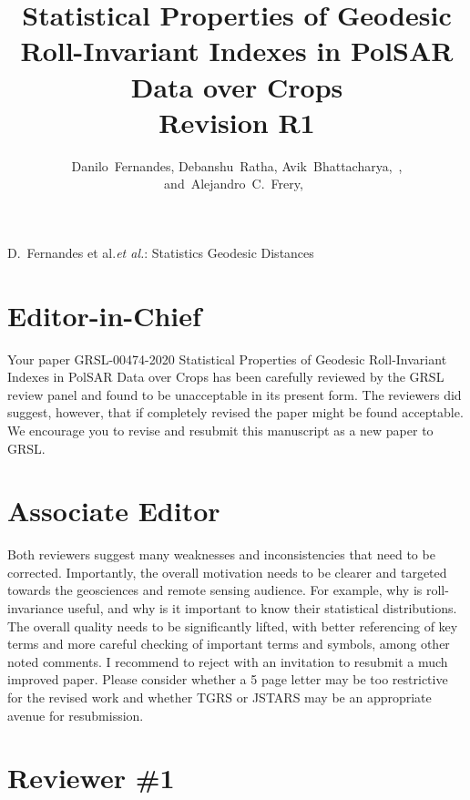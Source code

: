 \documentclass[journal,onecolumn,draftcls,11pt]{IEEEtran}
\begin{document}
\title{Statistical Properties of Geodesic Roll-Invariant Indexes in PolSAR Data over Crops\\
	Revision R1}

\author{Danilo~Fernandes,
	Debanshu~Ratha,
	Avik~Bhattacharya,~,
	and~Alejandro~C.~Frery,~}

%
{D.\ Fernandes et al.\MakeLowercase{\textit{et al.}}: Statistics Geodesic Distances}

\maketitle

\IEEEpeerreviewmaketitle

\section{Editor-in-Chief}

Your paper GRSL-00474-2020 Statistical Properties of Geodesic Roll-Invariant Indexes in PolSAR Data over Crops has been carefully reviewed by the GRSL review panel and found to be unacceptable in its present form. The reviewers did suggest, however, that if completely revised the paper might be found acceptable. We encourage you to revise and resubmit this manuscript as a new paper to GRSL.


\section{Associate Editor}

Both reviewers suggest many weaknesses and inconsistencies that need to be corrected.
Importantly, the overall motivation needs to be clearer and targeted towards the geosciences and remote sensing audience. For example, why is roll-invariance useful, and why is it important to know their statistical distributions.
The overall quality needs to be significantly lifted, with better referencing of key terms and more careful checking of important terms and symbols, among other noted comments.
I recommend to reject with an invitation to resubmit a much improved paper. Please consider whether a 5 page letter may be too restrictive for the revised work and whether TGRS or JSTARS may be an appropriate avenue for resubmission.


\section{Reviewer \#1}
\end{document}
